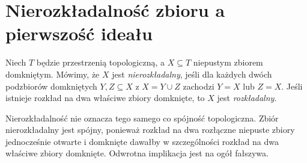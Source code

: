 \section{Nierozkładalność zbioru a pierwszość ideału}

\begin{definicja}
Niech $T$ będzie przestrzenią topologiczną, a $X\subseteq T$
niepustym zbiorem domkniętym.
Mówimy, że $X$ jest \emph{nierozkładalny}, jeśli dla każdych
dwóch podzbiorów domkniętych $Y,Z\subseteq X$ z
$X=Y\cup Z$ zachodzi $Y=X$ lub $Z=X$.
Jeśli istnieje rozkład na dwa właściwe zbiory domknięte,
to $X$ jest \emph{rozkładalny}.
\end{definicja}

Nierozkładalność nie oznacza tego samego co spójność topologiczna.
Zbiór nierozkładalny jest spójny, ponieważ rozkład na dwa
rozłączne niepuste zbiory jednocześnie otwarte i domknięte
dawałby w szczególności rozkład na dwa właściwe zbiory domknięte.
Odwrotna implikacja jest na ogół fałszywa.

